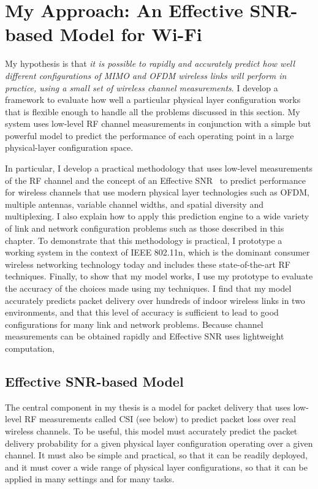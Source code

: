 \section{My Approach: An Effective SNR-based Model for Wi-Fi}
My hypothesis is that \emph{it is possible to rapidly and accurately predict how well different configurations of MIMO and OFDM wireless links will perform in practice, using a small set of wireless channel measurements}. I develop a framework to evaluate how well a particular physical layer configuration works that is flexible enough to handle all the problems discussed in this section. My system uses low-level RF channel measurements in conjunction with a simple but powerful model to predict the performance of each operating point in a large physical-layer configuration space.

In particular, I develop a practical methodology that uses low-level measurements of the RF channel and the concept of an Effective SNR~\cite{Nanda_EffectiveSNR} to predict performance for wireless channels that use modern physical layer technologies such as OFDM, multiple antennas, variable channel widths, and spatial diversity and multiplexing. I also explain how to apply this prediction engine to a wide variety of link and network configuration problems such as those described in this chapter. To demonstrate that this methodology is practical, I prototype a working system in the context of IEEE 802.11n, which is the dominant consumer wireless networking technology today and includes these state-of-the-art RF techniques. Finally, to show that my model works, I use my prototype to evaluate the accuracy of the choices made using my techniques. I find that my model accurately predicts packet delivery over hundreds of indoor wireless links in two environments, and that this level of accuracy is sufficient to lead to good configurations for many link and network problems. Because channel measurements can be obtained rapidly and Effective SNR uses lightweight computation, 

\subsection{Effective SNR-based Model}
The central component in my thesis is a model for packet delivery that uses low-level RF measurements called CSI (see  below) to predict packet loss over real wireless channels. To be useful, this model must accurately predict the packet delivery probability for a given physical layer configuration operating over a given channel. It must also be simple and practical, so that it can be readily deployed, and it must cover a wide range of physical layer configurations, so that it can be applied in many settings and for many tasks.

